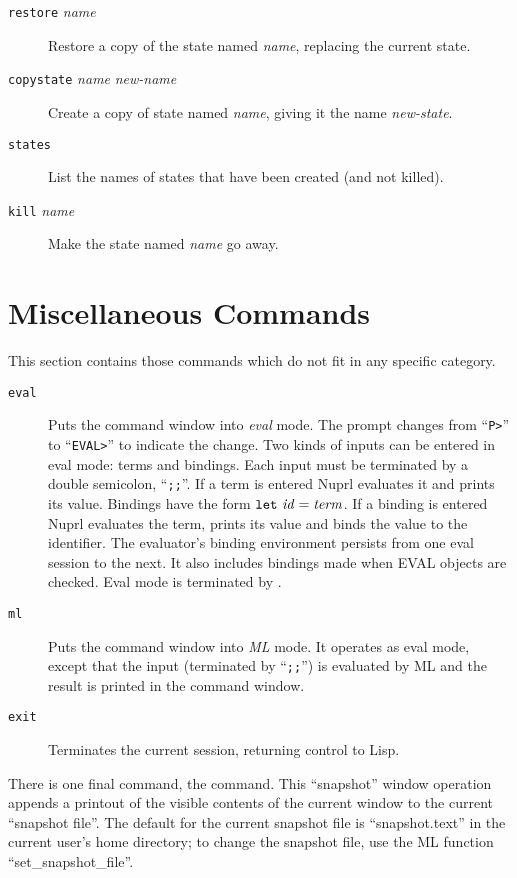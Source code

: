 \begin {description}
\item[{\tt restore} {\it name}]{} \hfill \break \noindent {}
Restore a copy of the state named {\it name}, replacing the current state.

\item[{\tt copystate} {\it name} {\it new-name}]{} \hfill \break \noindent {}
Create a copy of state named {\em name}, giving it the name {\em
new-state}.

\item[{\tt states} ]{} \hfill \break \noindent {}
List the names of states that have been created (and not killed).

\item[{\tt kill} {\it name}]{} \hfill \break \noindent {}
Make the state named {\it name} go away.


\end {description}


\section{Miscellaneous Commands}

This section contains those commands which do not fit in any specific
category.
%
\begin {description}
\item[{\tt eval}]{}{}
    Puts the command window into {\em eval} mode.
    The prompt changes from ``{\tt P>}'' to ``{\tt EVAL>}''{} to
    indicate the change.
    Two kinds of inputs can be entered in eval mode:
    terms and bindings.
    Each input must be terminated by a double semicolon, ``{\tt ;;}''.
    If a term is entered Nuprl evaluates it and prints its
    value.
    Bindings have the form \({\tt let}\ {\it id}={\it term}\).  If a binding
    is entered Nuprl evaluates the term, prints its value and binds the
    value to the identifier.
    The evaluator's binding environment persists from one eval session to the
    next.
    It also includes bindings made when EVAL objects are checked.
    Eval mode is terminated by \EXIT.

\item[{\tt ml}]{}{}
Puts the command window into {\em ML} mode.  It operates as eval mode,
except that the input (terminated by ``{\tt{};;}'') is evaluated by ML and
the result is printed in the command window.

\item[{\tt exit}]{}{} Terminates the current \prl{} session, returning
control to Lisp.


\end {description}

There is one final command, the \PRINT{}{} command.  This
``snapshot'' window operation appends a printout of the visible contents of
the current window to the current ``snapshot file''.  The default for the
current snapshot file is ``snapshot.text'' in the current user's home
directory; to change the snapshot file, use the ML function
``set\_snapshot\_file''.
